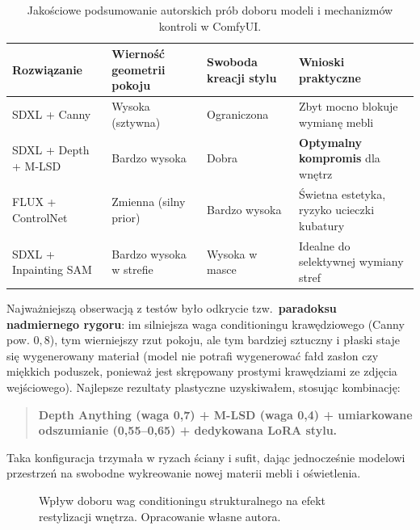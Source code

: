 \begin{table}[htbp]
  \centering
  \caption{Jakościowe podsumowanie autorskich prób doboru modeli i mechanizmów kontroli w ComfyUI.}
  \label{tab:ch04:modele}
  \begin{tabular}{@{}p{3.2cm}p{3.6cm}p{3.6cm}p{3.6cm}@{}}
    \toprule
    Rozwiązanie & Wierność geometrii pokoju & Swoboda kreacji stylu & Wnioski praktyczne \\
    \midrule
    SDXL + Canny & Wysoka (sztywna) & Ograniczona & Zbyt mocno blokuje wymianę mebli \\
    SDXL + Depth + M-LSD & Bardzo wysoka & Dobra & \textbf{Optymalny kompromis} dla wnętrz \\
    FLUX + ControlNet & Zmienna (silny prior) & Bardzo wysoka & Świetna estetyka, ryzyko ucieczki kubatury \\
    SDXL + Inpainting SAM & Bardzo wysoka w strefie & Wysoka w masce & Idealne do selektywnej wymiany stref \\
    \bottomrule
  \end{tabular}
\end{table}

Najważniejszą obserwacją z testów było odkrycie tzw.\ \textbf{paradoksu nadmiernego rygoru}: im silniejsza waga conditioningu krawędziowego (Canny pow. $0{,}8$), tym wierniejszy rzut pokoju, ale tym bardziej sztuczny i płaski staje się wygenerowany materiał (model nie potrafi wygenerować fałd zasłon czy miękkich poduszek, ponieważ jest skrępowany prostymi krawędziami ze zdjęcia wejściowego). Najlepsze rezultaty plastyczne uzyskiwałem, stosując kombinację:
\begin{quote}
\textbf{Depth Anything (waga 0,7) + M-LSD (waga 0,4) + umiarkowane odszumianie (0,55--0,65) + dedykowana LoRA stylu.}
\end{quote}
Taka konfiguracja trzymała w ryzach ściany i sufit, dając jednocześnie modelowi przestrzeń na swobodne wykreowanie nowej materii mebli i oświetlenia.

\begin{figure}[htbp]
  \centering
  \caption{Wpływ doboru wag conditioningu strukturalnego na efekt restylizacji wnętrza.
  Opracowanie własne autora.}
  \label{fig:ch04:model-comparison}
\end{figure}

